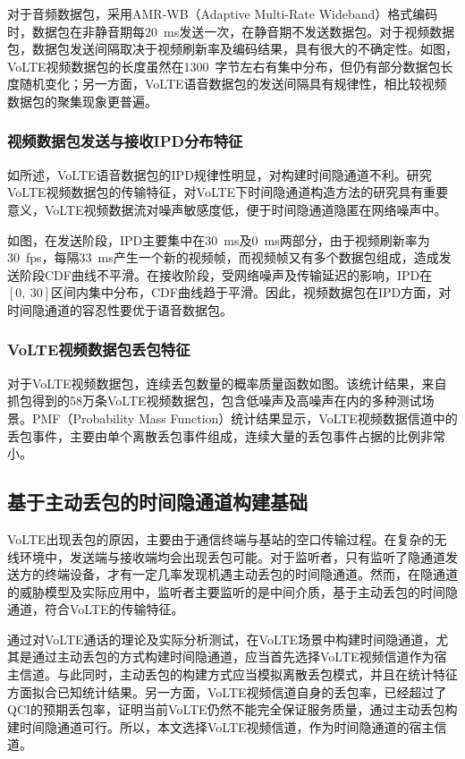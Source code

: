 对于音频数据包，采用AMR-WB（Adaptive Multi-Rate Wideband）格式编码时，数据包在非静音期每{20\ ms}发送一次，在静音期不发送数据包。对于视频数据包，数据包发送间隔取决于视频刷新率及编码结果，具有很大的不确定性。如图，VoLTE视频数据包的长度虽然在{1300\ 字节}左右有集中分布，但仍有部分数据包长度随机变化；另一方面，VoLTE语音数据包的发送间隔具有规律性，相比较视频数据包的聚集现象更普遍。

\subsubsection{视频数据包发送与接收IPD分布特征}
\label{chap:backinfo:volte:packets:ipd}
如所述，VoLTE语音数据包的IPD规律性明显，对构建时间隐通道不利。研究VoLTE视频数据包的传输特征，对VoLTE下时间隐通道构造方法的研究具有重要意义，VoLTE视频数据流对噪声敏感度低，便于时间隐通道隐匿在网络噪声中。

如图，在发送阶段，IPD主要集中在{30\ ms}及{0\ ms}两部分，由于视频刷新率为{30\ fps}，每隔{33\ ms}产生一个新的视频帧，而视频帧又有多个数据包组成，造成发送阶段CDF曲线不平滑。在接收阶段，受网络噪声及传输延迟的影响，IPD在$[0,\ 30]$区间内集中分布，CDF曲线趋于平滑。因此，视频数据包在IPD方面，对时间隐通道的容忍性要优于语音数据包。

\subsubsection{VoLTE视频数据包丢包特征}
\label{chap:backinfo:volte:packets:dropout}
对于VoLTE视频数据包，连续丢包数量的概率质量函数如图。该统计结果，来自抓包得到的58万条VoLTE视频数据包，包含低噪声及高噪声在内的多种测试场景。PMF（Probability Mass Function）统计结果显示，VoLTE视频数据信道中的丢包事件，主要由单个离散丢包事件组成，连续大量的丢包事件占据的比例非常小。

\subsection{基于主动丢包的时间隐通道构建基础}
\label{chap:backinfo:volte:scheme}
VoLTE出现丢包的原因，主要由于通信终端与基站的空口传输过程。在复杂的无线环境中，发送端与接收端均会出现丢包可能。对于监听者，只有监听了隐通道发送方的终端设备，才有一定几率发现机遇主动丢包的时间隐通道。然而，在隐通道的威胁模型及实际应用中，监听者主要监听的是中间介质，基于主动丢包的时间隐通道，符合VoLTE的传输特征。

通过对VoLTE通话的理论及实际分析测试，在VoLTE场景中构建时间隐通道，尤其是通过主动丢包的方式构建时间隐通道，应当首先选择VoLTE视频信道作为宿主信道。与此同时，主动丢包的构建方式应当模拟离散丢包模式，并且在统计特征方面拟合已知统计结果。另一方面，VoLTE视频信道自身的丢包率，已经超过了QCI的预期丢包率，证明当前VoLTE仍然不能完全保证服务质量，通过主动丢包构建时间隐通道可行。所以，本文选择VoLTE视频信道，作为时间隐通道的宿主信道。
